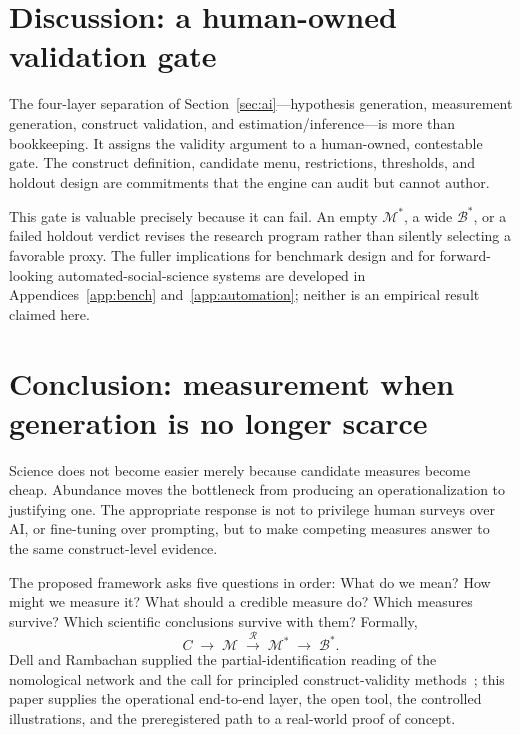 \documentclass[10pt,letterpaper]{article}
\newcommand{\M}{\ensuremath{\mathcal{M}}}
\newcommand{\Rset}{\mathcal{R}}
\newcommand{\Bset}{\mathcal{B}}
\begin{document}
\section{Discussion: a human-owned validation gate}
\label{sec:discussion}
The four-layer separation of Section~\ref{sec:ai}---hypothesis generation, measurement generation, construct validation, and estimation/inference---is more than bookkeeping. It assigns the validity argument to a human-owned, contestable gate. The construct definition, candidate menu, restrictions, thresholds, and holdout design are commitments that the engine can audit but cannot author.

This gate is valuable precisely because it can fail. An empty $\M^*$, a wide $\Bset^*$, or a failed holdout verdict revises the research program rather than silently selecting a favorable proxy. The fuller implications for benchmark design and for forward-looking automated-social-science systems are developed in Appendices~\ref{app:bench} and~\ref{app:automation}; neither is an empirical result claimed here.

\section{Conclusion: measurement when generation is no longer scarce}
Science does not become easier merely because candidate measures become cheap.
Abundance moves the bottleneck from producing an operationalization to justifying one.
The appropriate response is not to privilege human surveys over AI, or fine-tuning over prompting, but to make competing measures answer to the same construct-level evidence.

The proposed framework asks five questions in order:
What do we mean?
How might we measure it?
What should a credible measure do?
Which measures survive?
Which scientific conclusions survive with them?
Formally,
\[
C\;\longrightarrow\;\M\;\xrightarrow{\Rset}\;\M^*\;\longrightarrow\;\Bset^*.
\]
Dell and Rambachan supplied the partial-identification reading of the nomological network and the call for principled construct-validity methods~\cite{dellrambachan2026}; this paper supplies the operational end-to-end layer, the open tool, the controlled illustrations, and the preregistered path to a real-world proof of concept.
\end{document}
